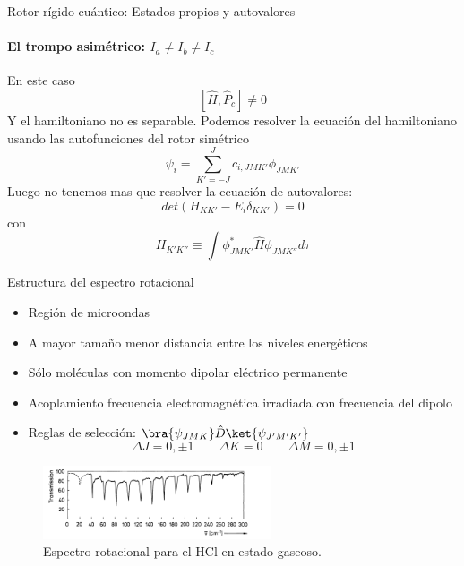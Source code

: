 \documentclass[a4paper]{beamer}
\begin{document}
\begin{frame}{Rotor rígido cuántico: Estados propios y autovalores}
\framesubtitle {El trompo asimétrico: $I_a \neq I_b\neq I_c$ }
En este caso
\begin{equation*}
\left[\hat H,\hat P_c \right] \neq 0
\end{equation*}
Y el hamiltoniano no es separable.
Podemos resolver la ecuación del hamiltoniano usando  las autofunciones del rotor simétrico
\begin{equation*}
\psi_i = \sum_{K'=-J}^Jc_{i,JMK'}\phi_{JMK'}
\end{equation*}
Luego no tenemos mas que resolver la ecuación de autovalores:
\begin{equation*}
det(H_{KK'}-E_i\delta_{KK'})=0
\end{equation*}
con
\begin{equation*}
H_{K'K''}\equiv\int\phi^*_{JMK'}\hat H\phi_{JMK''}d\tau
\end{equation*}
\end{frame}

\begin{frame}{Estructura del espectro rotacional}
\begin{itemize}
\item Región de microondas
\item A mayor tamaño menor distancia entre los niveles energéticos
\item Sólo moléculas con momento dipolar eléctrico permanente
\item Acoplamiento frecuencia electromagnética irradiada con frecuencia del dipolo
\item Reglas de selección: $\bra{\psi_{JMK}}\hat D \ket{\psi_{J'M'K'}}$
\begin{equation*}
\Delta J = 0,\pm 1 \qquad\Delta K =0 \qquad \Delta M = 0, \pm 1
\end{equation*}
\end{itemize}
\begin{figure}
\includegraphics[width=0.6\textwidth]{intensidad.png}
\caption{Espectro rotacional para el HCl en estado gaseoso.}
\label{intensidad}
\end{figure}
\end{frame}
\end{document}
